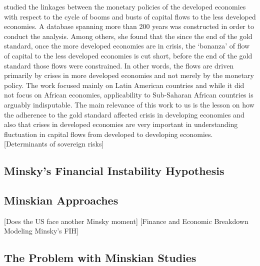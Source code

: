 \documentclass[14pt, a4paper]{article}
\begin{document}
	\cite{Andre-2005} %
	\cite{eaton1995sovereign} %
	 studied the linkages between the monetary policies of the developed economies with respect to the cycle of booms and busts of capital flows to the less developed economies. A database spanning more than 200 years was constructed in order to conduct the analysis. Among others, she found that the since the end of the gold standard, once the more developed economies are in crisis, the `bonanza' of flow of capital to the less developed economies is cut short, before the end of the gold standard those flows were constrained. In other words, the flows are driven primarily by crises in more developed economies and not merely by the monetary policy. The work focused mainly on Latin American countries and while it did not focus on African economies, applicability to Sub-Saharan African countries is arguably indisputable. The main relevance of this work to us is the lesson on how the adherence to the gold standard affected crisis in developing economies and also that crises in developed economies are very important in understanding fluctuation in capital flows from developed to developing economies.
	[Determinants of sovereign risks] %
	\cite{OY-2011} %
	\cite{d2018history}
	\cite{Marc-2008} %
	
	\subsection{Minsky's Financial Instability Hypothesis}
	\cite{vercelli2009theory}
	\cite{minsky2016can}
	\subsection{Minskian Approaches}
	\cite{nikolaidi2017three}
	\cite{asada2012modeling}
	\cite{christiantoeconomic}
	\cite{vercelli2009perspective}
	\cite{rosser2017minsky}
	[Does the US face another Minsky moment] %
	\cite{vadasz2007economic}
	[Finance and Economic Breakdown Modeling Minsky's FIH] %
	\subsection{The Problem with Minskian Studies}
	\newpage
	\singlespacing
		
	
\end{document}
